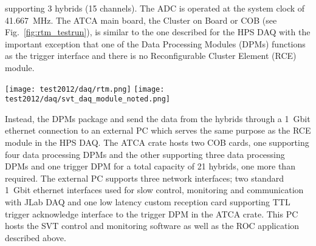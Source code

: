 supporting 3 hybrids (15 channels). The ADC is operated at the system clock of 41.667~MHz. 
The ATCA main board, the Cluster on Board or COB (see Fig.~\ref{fig:rtm_testrun}), is similar to the one described for the HPS DAQ 
with the important exception that one of the Data Processing Modules (DPMs) functions as the trigger 
interface and there is no Reconfigurable Cluster Element (RCE) module. 
\begin{figure*}[t]
\texttt{[image: test2012/daq/rtm.png]}
\texttt{[image: test2012/daq/svt\_daq\_module\_noted.png]}
\caption{\small{Picture of a RTM (top) and COB board (bottom) used in the HPS test run 2012.}}
\label{fig:rtm_testrun}
\end{figure*}
Instead, the DPMs package and send the data from the hybrids through a 1~Gbit ethernet connection to 
an external PC which serves the same purpose as the 
RCE module in the HPS DAQ. 
The ATCA crate hosts two COB cards, one supporting four data processing DPMs and the other supporting three data processing DPMs and one trigger DPM for a total capacity of 21 hybrids, one more than required. 
The external PC supports three network interfaces; two standard 1~Gbit ethernet interfaces used for slow control, monitoring and communication with JLab DAQ and one low latency custom reception card supporting TTL trigger acknowledge interface to the trigger DPM in the ATCA crate. 
This PC hosts the SVT control and monitoring 
software as well as the ROC application described above.
